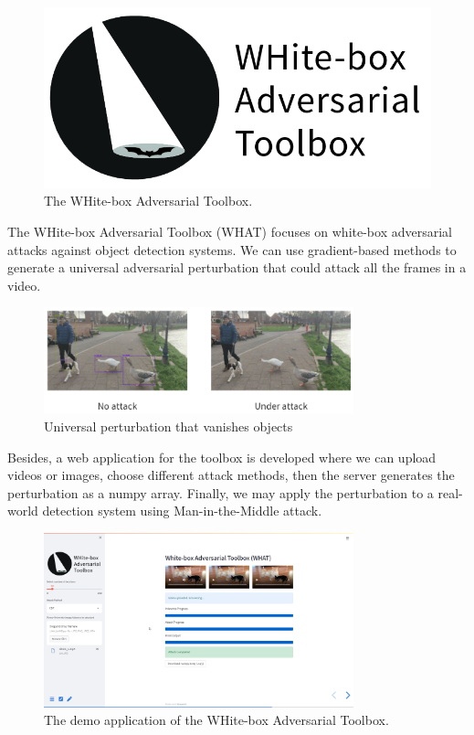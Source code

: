 \begin{figure}[H]
    \centering
    \includegraphics[scale=0.4]{figures/chapter_detection/what.png}
    \caption{The WHite-box Adversarial Toolbox.}
    \label{fig:what}
\end{figure}

The WHite-box Adversarial Toolbox (WHAT) focuses on white-box adversarial attacks against object detection systems. We can use gradient-based methods to generate a universal adversarial perturbation that could attack all the frames in a video.

\begin{figure}[H]
    \centering
    \includegraphics[width=0.8\textwidth]{figures/chapter_detection/what-attack.png}
    \caption{Universal perturbation that vanishes objects}
    \label{fig:what_attack}
\end{figure}

Besides, a web application for the toolbox is developed where we can upload videos or images, choose different attack methods, then the server generates the perturbation as a numpy array. Finally, we may apply the perturbation to a real-world detection system using Man-in-the-Middle attack.

\begin{figure}[H]
    \centering
    \includegraphics[width=0.8\textwidth]{figures/chapter_detection/what-app.png}
    \caption{The demo application of the WHite-box Adversarial Toolbox.}
    \label{fig:what_app}
\end{figure}

